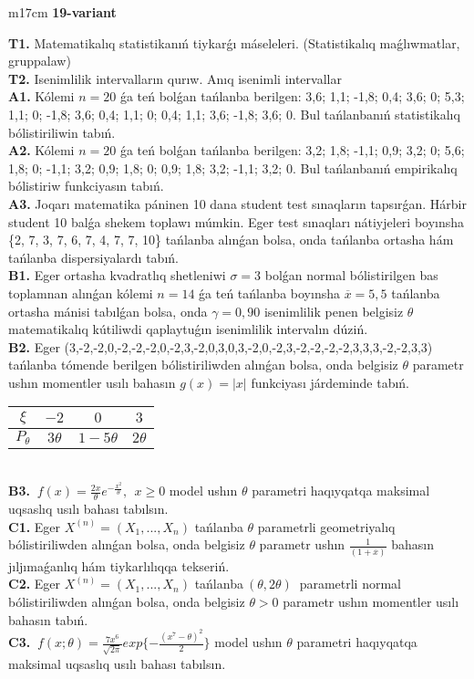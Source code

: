 \documentclass{article}
\begin{document}
\begin{tabular}{m{17cm}}
\textbf{19-variant}
\newline

\textbf{T1.} Matematikalıq statistikanıń tiykarǵı máseleleri. (Statistikalıq maǵlıwmatlar, gruppalaw)
 \\
\textbf{T2.} 
Isenimlilik intervalların qurıw. Anıq isenimli intervallar
 \\
\textbf{A1.} 
Kólemi \(n = 20\) ǵa teń bolǵan tańlanba berilgen: 3,6; 1,1; -1,8; 0,4; 3,6; 0; 5,3; 1,1; 0; -1,8; 3,6; 0,4; 1,1; 0; 0,4; 1,1; 3,6; -1,8; 3,6; 0. Bul tańlanbanıń statistikalıq bólistiriliwin tabıń.
 \\
\textbf{A2.} 
Kólemi \(n = 20\) ǵa teń bolǵan tańlanba berilgen: 3,2; 1,8; -1,1; 0,9; 3,2; 0; 5,6; 1,8; 0; -1,1; 3,2; 0,9; 1,8; 0; 0,9; 1,8; 3,2; -1,1; 3,2; 0. Bul tańlanbanıń empirikalıq bólistiriw funkciyasın tabıń.
 \\
\textbf{A3.} 
Joqarı matematika páninen 10 dana student test sınaqların tapsırǵan. Hárbir student 10 balǵa shekem toplawı múmkin. Eger test sınaqları nátiyjeleri boyınsha \{2, 7, 3, 7, 6, 7, 4, 7, 7, 10\} tańlanba alınǵan bolsa, onda tańlanba ortasha hám tańlanba dispersiyalardı tabıń.
 \\
\textbf{B1.} 
Eger ortasha kvadratlıq shetleniwi \(\sigma = 3\) bolǵan normal bólistirilgen bas toplamnan alınǵan kólemi \(n = 14\) ǵa teń tańlanba boyınsha \(\overline{x} = 5,5\) tańlanba ortasha mánisi tabılǵan bolsa, onda \(\gamma = 0,90\) isenimlilik penen belgisiz \(\theta\) matematikalıq kútiliwdi qaplaytuǵın isenimlilik intervalın dúziń.
 \\
\textbf{B2.} 
Eger (3,-2,-2,0,-2,-2,-2,0,-2,3,-2,0,3,0,3,-2,0,-2,3,-2,-2,-2,-2,3,3,3,-2,-2,3,3) tańlanba tómende berilgen bólistiriliwden alınǵan bolsa, onda belgisiz \(\theta\) parametr ushın momentler usılı bahasın \(g(x) = |x|\) funkciyası járdeminde tabıń.
\begin{tabular}{|c|c|c|c|}
  \hline
$\xi$ &
$- 2$ &
$0$ &
$3$ \\
\hline
\(P_{\theta}\) & \(3\theta\) & \(1 - 5\theta\) & \(2\theta\) \\
\hline
\end{tabular}
 \\
\textbf{B3.} 
\(\ f(x) = \frac{2x}{\theta}e^{- \frac{x^{2}}{\theta}},\ \ x \geq 0\) model ushın \(\theta\) parametri haqıyqatqa maksimal uqsaslıq usılı bahası tabılsın.
 \\
\textbf{C1.} 
Eger \(X^{(n)} = \left( X_{1},...,X_{n} \right)\) tańlanba \(\theta\) parametrli geometriyalıq bólistiriliwden alınǵan bolsa, onda belgisiz \(\theta\) parametr ushın \(\frac{1}{(1 + \overline{x})}\) bahasın jıljımaǵanlıq hám tiykarlılıqqa tekseriń.
 \\
\textbf{C2.} 
Eger \(X^{(n)} = \left( X_{1},...,X_{n} \right)\) tańlanba\(\ (\theta,2\theta)\ \) parametrli normal bólistiriliwden alınǵan bolsa, onda belgisiz \(\theta > 0\) parametr ushın momentler usılı bahasın tabıń.
 \\
\textbf{C3.} 
\(\ f(x;\theta) = \frac{7x^{6}}{\sqrt{2\pi}}exp\{ - \frac{(x^{7} - \theta)^{2}}{2}\}\) model ushın \(\theta\) parametri haqıyqatqa maksimal uqsaslıq usılı bahası tabılsın.
 \\


\end{tabular}
\end{document}
